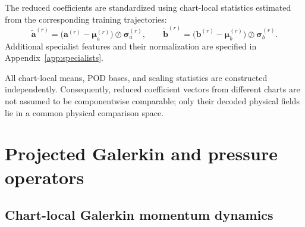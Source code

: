 The reduced coefficients are standardized using chart-local statistics
estimated from the corresponding training trajectories:
\begin{equation}
    \widetilde{\bm a}^{(r)}
    =
    \bigl(
        \bm a^{(r)}-\bm\mu_a^{(r)}
    \bigr)
    \oslash
    \bm\sigma_a^{(r)},
    \qquad
    \widetilde{\bm b}^{(r)}
    =
    \bigl(
        \bm b^{(r)}-\bm\mu_b^{(r)}
    \bigr)
    \oslash
    \bm\sigma_b^{(r)}.
    \label{eq:app_local_scalers}
\end{equation}
Additional specialist features and their normalization are specified in
Appendix~\ref{app:specialists}.

All chart-local means, POD bases, and scaling statistics are constructed
independently.
Consequently, reduced coefficient vectors from different charts are not
assumed to be componentwise comparable; only their decoded physical fields lie in a common physical comparison space.






\section{Projected Galerkin and pressure operators}
\label{app:rom}

\subsection{Chart-local Galerkin momentum dynamics}

